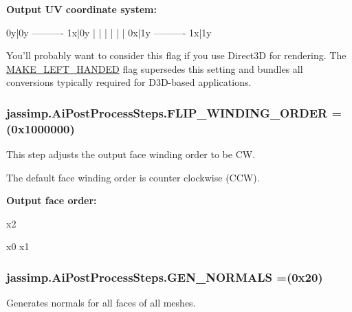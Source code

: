 {\bfseries Output U\+V coordinate system\+:}~\newline
 {\ttfamily 
\begin{DoxyPre}
0y|0y ---------- 1x|0y 
  |                | 
  |                |
  |                | 
0x|1y ---------- 1x|1y
\end{DoxyPre}
} 

You'll probably want to consider this flag if you use Direct3\+D for rendering. The \hyperlink{enumjassimp_1_1_ai_post_process_steps_af605bf70f0a61961ff0efdf9f21e0622}{M\+A\+K\+E\+\_\+\+L\+E\+F\+T\+\_\+\+H\+A\+N\+D\+E\+D} flag supersedes this setting and bundles all conversions typically required for D3\+D-\/based applications. \hypertarget{enumjassimp_1_1_ai_post_process_steps_a4a57c50d90a729344533e1a0228a654d}{
\subsubsection[{F\+L\+I\+P\+\_\+\+W\+I\+N\+D\+I\+N\+G\+\_\+\+O\+R\+D\+E\+R}]{\setlength{\rightskip}{0pt plus 5cm}jassimp.\+Ai\+Post\+Process\+Steps.\+F\+L\+I\+P\+\_\+\+W\+I\+N\+D\+I\+N\+G\+\_\+\+O\+R\+D\+E\+R =(0x1000000)}}\label{enumjassimp_1_1_ai_post_process_steps_a4a57c50d90a729344533e1a0228a654d}
This step adjusts the output face winding order to be C\+W.

The default face winding order is counter clockwise (C\+C\+W).

{\bfseries Output face order\+:}

{\ttfamily 
\begin{DoxyPre}
       x2\end{DoxyPre}
}

{\ttfamily 
\begin{DoxyPre}                     x0 
 x1
\end{DoxyPre}
} \hypertarget{enumjassimp_1_1_ai_post_process_steps_a72fa11465e238a3a5a156c061f3c68b3}{
\subsubsection[{G\+E\+N\+\_\+\+N\+O\+R\+M\+A\+L\+S}]{\setlength{\rightskip}{0pt plus 5cm}jassimp.\+Ai\+Post\+Process\+Steps.\+G\+E\+N\+\_\+\+N\+O\+R\+M\+A\+L\+S =(0x20)}}\label{enumjassimp_1_1_ai_post_process_steps_a72fa11465e238a3a5a156c061f3c68b3}
Generates normals for all faces of all meshes.

